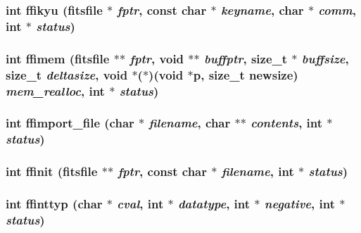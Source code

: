 \subsubsection{\setlength{\rightskip}{0pt plus 5cm}int ffikyu (\bf{fitsfile} $\ast$ {\em fptr}, const char $\ast$ {\em keyname}, char $\ast$ {\em comm}, int $\ast$ {\em status})}\label{fitsio__64_8h_ac2fa658a69fab1f16bd0b0b5d492bd3}


\subsubsection{\setlength{\rightskip}{0pt plus 5cm}int ffimem (\bf{fitsfile} $\ast$$\ast$ {\em fptr}, void $\ast$$\ast$ {\em buffptr}, size\_\-t $\ast$ {\em buffsize}, size\_\-t {\em deltasize}, void $\ast$($\ast$)(void $\ast$p, size\_\-t newsize) {\em mem\_\-realloc}, int $\ast$ {\em status})}\label{fitsio__64_8h_ad075adabaf2dc2bcd43717eaed768fa}


\subsubsection{\setlength{\rightskip}{0pt plus 5cm}int ffimport\_\-file (char $\ast$ {\em filename}, char $\ast$$\ast$ {\em contents}, int $\ast$ {\em status})}\label{fitsio__64_8h_39fd7b9ba945cd1b97c979d71dd85184}


\subsubsection{\setlength{\rightskip}{0pt plus 5cm}int ffinit (\bf{fitsfile} $\ast$$\ast$ {\em fptr}, const char $\ast$ {\em filename}, int $\ast$ {\em status})}\label{fitsio__64_8h_7bcc7eb7ff6f0bf2ab7f40cc161b6dc0}


\subsubsection{\setlength{\rightskip}{0pt plus 5cm}int ffinttyp (char $\ast$ {\em cval}, int $\ast$ {\em datatype}, int $\ast$ {\em negative}, int $\ast$ {\em status})}\label{fitsio__64_8h_778a92c2e72fdc4e17b0f810c80f0072}


